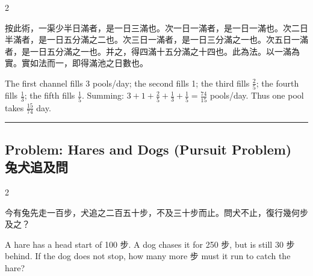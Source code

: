 \documentclass[10pt,a4paper]{article}
\newcommand{\longline}{\noindent\rule{\textwidth}{0.4pt}}
\begin{document}
\begin{paracol}{2}

\begin{leftcolumn*}
\begin{commentarybi}
按此術，一渠少半日滿者，是一日三滿也。次一日一滿者，是一日一滿也。次二日半滿者，是一日五分滿之二也。次三日一滿者，是一日三分滿之一也。次五日一滿者，是一日五分滿之一也。并之，得四滿十五分滿之十四也。此為法。以一滿為實。實如法而一，即得滿池之日數也。
\end{commentarybi}
\end{leftcolumn*}

\begin{rightcolumn*}
\begin{commentarybi}
The first channel fills 3 pools/day; the second fills 1; the third fills $\frac{2}{5}$; the fourth fills $\frac{1}{3}$; the fifth fills $\frac{1}{5}$. Summing: $3 + 1 + \frac{2}{5} + \frac{1}{3} + \frac{1}{5} = \frac{74}{15}$ pools/day. Thus one pool takes $\frac{15}{74}$ day.
\end{commentarybi}
\end{rightcolumn*}

\end{paracol}

\vspace{0.3cm}
\longline
\vspace{0.3cm}

\subsection{Problem: Hares and Dogs (Pursuit Problem) 兔犬追及問}

\begin{paracol}{2}

\begin{leftcolumn*}
\begin{problembi}[\textbf{問} · 兔犬]
今有兔先走一百步，犬追之二百五十步，不及三十步而止。問犬不止，復行幾何步及之？
\end{problembi}
\end{leftcolumn*}

\begin{rightcolumn*}
\begin{problembi}
A hare has a head start of 100 步. A dog chases it for 250 步, but is still 30 步 behind. If the dog does not stop, how many more 步 must it run to catch the hare?
\end{problembi}
\end{rightcolumn*}

\end{paracol}
\end{document}
